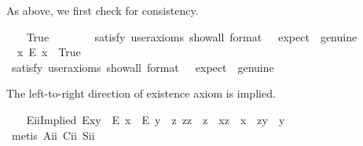 \begin{isabellebody}
\begin{isamarkuptext}%
As above, we first check for consistency.%
\end{isamarkuptext}\isamarkuptrue%
\ \ \isamarkupfalse%
\ True\ \ %
\isanewline
\ \ \ \ \isamarkupfalse%
\ {\isacharbrackleft}satisfy{\isacharcomma}\ user{\isacharunderscore}axioms{\isacharcomma}\ show{\isacharunderscore}all{\isacharcomma}\ format\ {\isacharequal}\ {}{\isacharcomma}\ expect\ {\isacharequal}\ genuine{\isacharbrackright}%
\isadelimproof
\ %
\endisadelimproof
%
\isatagproof
{}\isamarkupfalse%
%
\endisatagproof
{\isafoldproof}%
%
\isadelimproof
%
\endisadelimproof
\isanewline
\ \ \isamarkupfalse%
\ \ {\isachardoublequoteopen}{\isasymexists}x{\isachardot}\ \isactrlbold {\isasymnot}{\isacharparenleft}E\ x{\isacharparenright}{\isachardoublequoteclose}\ \ True\ \ %
\ \ \isanewline
\ \ \ \ \isamarkupfalse%
\ {\isacharbrackleft}satisfy{\isacharcomma}\ user{\isacharunderscore}axioms{\isacharcomma}\ show{\isacharunderscore}all{\isacharcomma}\ format\ {\isacharequal}\ {}{\isacharcomma}\ expect\ {\isacharequal}\ genuine{\isacharbrackright}%
\isadelimproof
\ %
\endisadelimproof
%
\isatagproof
{}\isamarkupfalse%
%
\endisatagproof
{\isafoldproof}%
%
\isadelimproof
%
\endisadelimproof
%
\begin{isamarkuptext}%
The left-to-right direction of existence axiom  is implied.%
\end{isamarkuptext}\isamarkuptrue%
\ \ \isamarkupfalse%
\ E\isactrlsub i\isactrlsub iImplied{\isacharcolon}\ {\isachardoublequoteopen}E{\isacharparenleft}x{\isasymcdot}y{\isacharparenright}\ \isactrlbold {\isasymrightarrow}\ {\isacharparenleft}E\ x\ \isactrlbold {\isasymand}\ E\ y\ \isactrlbold {\isasymand}\ {\isacharparenleft}\isactrlbold {\isasymexists}z{\isachardot}\ z{\isasymcdot}z\ {\isasymcong}\ z\ \isactrlbold {\isasymand}\ x{\isasymcdot}z\ {\isasymcong}\ x\ \isactrlbold {\isasymand}\ z{\isasymcdot}y\ {\isasymcong}\ y{\isacharparenright}{\isacharparenright}{\isachardoublequoteclose}\ \isanewline
%
\isadelimproof
\ \ \ \ %
\endisadelimproof
%
\isatagproof
{}\isamarkupfalse%
\ {\isacharparenleft}metis\ A\isactrlsub i\isactrlsub i\ C\isactrlsub i\isactrlsub i\ S\isactrlsub i\isactrlsub i{\isacharparenright}%
\endisatagproof
{\isafoldproof}%
%
\isadelimproof
%
\endisadelimproof

\end{isabellebody}
